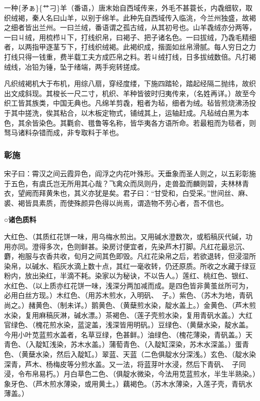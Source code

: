 \documentclass[]{article}
\begin{document}
一种\{矛ぁ\}\{艹刁\}羊（番语，）唐末始自西域传来，外毛不甚蓑长，内毳细软，取织绒褐，秦人名曰山羊，以别于绵羊。此种先自西域传入临洮，今兰州独盛，故褐之细者皆出兰州。一曰兰绒，番语谓之孤古绒，从其初号也。山羊毳绒亦分两等，一曰ㄐ绒，用梳栉ㄐ下，打线织帛，曰褐子、把子诸名色。一曰拔绒，乃毳毛精细者，以两指甲逐茎ㄎ下，打线织绒褐。此褐织成，揩面如丝帛滑腻。每人穷日之力打线只得一钱重，费半载工夫方成匹帛之料。若ㄐ绒打线，日多拔绒数倍。凡打褐绒线，冶铅为锤，坠于绪端，两手宛转搓成。

凡织绒褐机大于布机，用综八扇，穿经度缕，下施四踏轮，踏起经隔二抛纬，故织出文成斜现。其梭长一尺二寸，机织、羊种皆彼时归夷传来，（名姓再详。）故至今织工皆其族类，中国无典也。凡绵羊剪毳，粗者为毡，细者为绒。毡皆煎烧沸汤投于其中搓洗，俟其粘合，以木板定物式，铺绒其上，运轴赶成。凡毡绒白黑为本色，其余皆染色。其氍俞、氆鲁等名称，皆华夷各方语所命。若最粗而为毯者，则驽马诸料杂错而成，非专取料于羊也。

\hypertarget{header-n2344}{%
\subsubsection{彰施}\label{header-n2344}}

宋子曰：霄汉之间云霞异色，阎浮之内花叶殊形。天垂象而圣人则之，以五彩彰施于五色，有虞氏岂无所用其心哉？飞禽众而凤则丹，走兽盈而麟则碧，夫林林青衣，望阙而拜黄朱也，其义亦犹是矣。君子曰：``甘受和，白受采。''世间丝、麻、裘、褐皆具素质，而使殊颜异色得以尚焉，谓造物不劳心者，吾不信也。

\textbf{○诸色质料}

大红色、（其质红花饼一味，用乌梅水煎出。又用碱水澄数次，或稻稿灰代碱，功用亦同。澄得多次，色则鲜甚。染房讨便宜者，先染芦木打脚。凡红花最忌沉、麝，袍服与衣香共收，旬月之间其色即毁。凡红花染帛之后，若欲退转，但浸湿所染帛，以碱水、稻灰水滴上数十点，其红一毫收转，仍还原质。所收之水藏于绿豆粉内，放出染红，半滴不耗。染家以为秘诀，不以告人。）莲红、桃红色、银红、水红色、（以上质亦红花饼一味，浅深分两加减而成。是四色皆非黄茧丝所可为，必用白丝方现。）木红色、（用苏木煎水，入明矾、子。）紫色、（苏木为地，青矾尚之。）赭黄色、（制未详。）鹅黄色、（黄蘖煎水染，靛水盖上。）金黄色、（芦木煎水染，复用麻稿灰淋，碱水漂。）茶褐色、（莲子壳煎水染，复用青矾水盖。）大红官绿色、（槐花煎水染，蓝淀盖，浅深皆用明矾。）豆绿色、（黄蘖水染，靛水盖。今用小叶苋蓝煎水盖者，名草豆绿，色甚鲜。）油绿色、（槐花薄染，青矾盖。）天青色、（入靛缸浅染，苏木水盖。）蒲萄青色、（入靛缸深染，苏木水深盖。）蛋青色、（黄蘖水染，然后入靛缸。）翠蓝、天蓝（二色俱靛水分深浅。）玄色、（靛水染深青，芦木、杨梅皮等分煎水盖。又一法，将蓝芽叶水浸，然后下青矾、子同浸，令布帛易朽。）月白草色二色、（俱靛水微染，今法用苋蓝煎水，半生半熟染。）象牙色、（芦木煎水薄染，或用黄土。）藕褐色。（苏木水薄染，入莲子壳，青矾水薄盖。）
\end{document}
